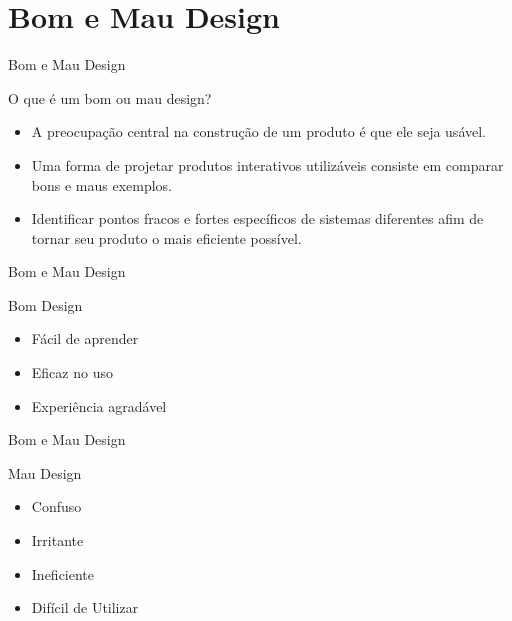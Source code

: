 \section{Bom e Mau Design}

\begin{frame}{Bom e Mau Design}{}
\begin{block}{O que é um bom ou mau design?}
  \begin{itemize}
    \item<1-> A preocupação central na construção de um produto é que ele seja usável.
    \item<2-> Uma forma de projetar produtos interativos utilizáveis consiste em comparar bons e maus exemplos.
    \item<3-> Identificar pontos fracos e fortes específicos de sistemas diferentes afim de tornar seu produto o mais eficiente possível.
  \end{itemize}
\end{block}
\end{frame}

\begin{frame}{Bom e Mau Design}{}
\begin{block}{Bom Design}
  \begin{itemize}
    \item<1-> Fácil de aprender
    \item<2-> Eficaz no uso
    \item<3-> Experiência agradável
  \end{itemize}
\end{block}
\end{frame}

\begin{frame}{Bom e Mau Design}
\begin{block}{Mau Design}
  \begin{itemize}
    \item<1-> Confuso
    \item<2-> Irritante
    \item<3-> Ineficiente
    \item<4-> Difícil de Utilizar
  \end{itemize}
\end{block}
\end{frame}
